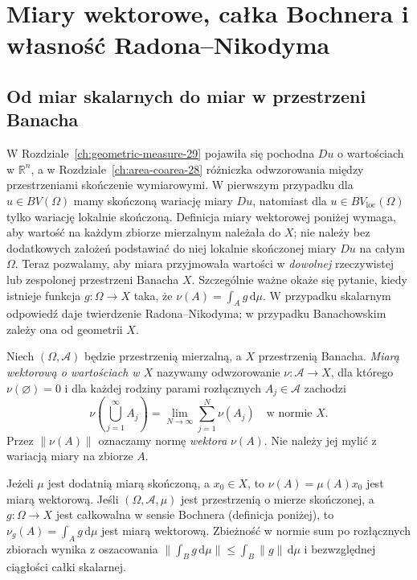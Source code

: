 \chapter[Miary wektorowe i własność Radona--Nikodyma]{Miary wektorowe, całka Bochnera i własność Radona--Nikodyma}
\label{ch:vector-measures-30}

\section{Od miar skalarnych do miar w przestrzeni Banacha}
\label{sec:vector-intro-30}
W Rozdziale~\ref{ch:geometric-measure-29} pojawiła się
pochodna $Du$ o wartościach w $\mathbb R^n$,
a w Rozdziale~\ref{ch:area-coarea-28} różniczka
odwzorowania między przestrzeniami skończenie wymiarowymi.
W pierwszym przypadku dla $u\in BV(\Omega)$ mamy
skończoną wariację miary $Du$, natomiast dla
$u\in BV_{\mathrm{loc}}(\Omega)$ tylko wariację
lokalnie skończoną. Definicja miary wektorowej
poniżej wymaga, aby wartość na każdym zbiorze
mierzalnym należała do $X$; nie należy bez dodatkowych
założeń podstawiać do niej lokalnie skończonej
miary $Du$ na całym $\Omega$. Teraz pozwalamy, aby miara przyjmowała
wartości w \emph{dowolnej} rzeczywistej lub zespolonej przestrzeni
Banacha $X$. Szczególnie ważne okaże się pytanie, kiedy istnieje
funkcja $g:\Omega\to X$ taka, że $\nu(A)=\int_Ag\,\mathrm d\mu$.
W przypadku skalarnym odpowiedź daje twierdzenie Radona--Nikodyma;
w przypadku Banachowskim zależy ona od geometrii $X$.

\begin{definicja}
\label{def:vector-measure-30}
Niech $(\Omega,\mathcal A)$ będzie przestrzenią mierzalną,
a $X$ przestrzenią Banacha. \emph{Miarą wektorową o wartościach w $X$}
nazywamy odwzorowanie $\nu:\mathcal A\to X$, dla którego
$\nu(\varnothing)=0$ i dla każdej rodziny parami rozłącznych
$A_j\in\mathcal A$ zachodzi
\[
 \nu\left(\bigcup_{j=1}^{\infty}A_j\right)
 =\lim_{N\to\infty}\sum_{j=1}^{N}\nu(A_j)
 \quad\text{w normie }X.
\]
Przez $\|\nu(A)\|$ oznaczamy normę \emph{wektora} $\nu(A)$.
Nie należy jej mylić z wariacją miary na zbiorze $A$.
\end{definicja}

\begin{przyklad}
\label{ex:basic-vector-measures-30}
Jeżeli $\mu$ jest dodatnią miarą skończoną, a $x_0\in X$,
to $\nu(A)=\mu(A)x_0$ jest miarą wektorową.
Jeśli $(\Omega,\mathcal A,\mu)$ jest przestrzenią o mierze
skończonej, a $g:\Omega\to X$ jest całkowalna w sensie
Bochnera (definicja poniżej), to
$\nu_g(A)=\int_Ag\,\mathrm d\mu$ jest miarą wektorową.
Zbieżność w normie sum po rozłącznych zbiorach
wynika z oszacowania
$\|\int_Bg\,\mathrm d\mu\|\le\int_B\|g\|\,\mathrm d\mu$
i bezwzględnej ciągłości całki skalarnej.
\end{przyklad}


